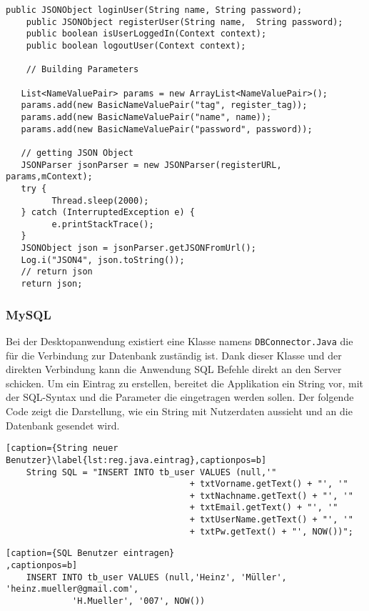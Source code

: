 \begin{lstlisting}[caption={User Functions},captionpos=b]
    public JSONObject loginUser(String name, String password);
    public JSONObject registerUser(String name,  String password);
    public boolean isUserLoggedIn(Context context);
    public boolean logoutUser(Context context);
    
    // Building Parameters

   List<NameValuePair> params = new ArrayList<NameValuePair>();
   params.add(new BasicNameValuePair("tag", register_tag));
   params.add(new BasicNameValuePair("name", name));
   params.add(new BasicNameValuePair("password", password));

   // getting JSON Object
   JSONParser jsonParser = new JSONParser(registerURL, params,mContext);
   try {
         Thread.sleep(2000);
   } catch (InterruptedException e) {
         e.printStackTrace();
   }
   JSONObject json = jsonParser.getJSONFromUrl();
   Log.i("JSON4", json.toString());
   // return json
   return json;
\end{lstlisting}


\subsubsection{MySQL}
Bei der Desktopanwendung existiert eine Klasse namens \texttt{DBConnector.Java} die für die Verbindung zur Datenbank zuständig ist. Dank dieser Klasse und der direkten Verbindung kann die Anwendung  SQL Befehle direkt an den Server schicken. Um ein Eintrag zu erstellen, bereitet die Applikation ein String vor, mit der SQL-Syntax und die Parameter die eingetragen werden sollen. Der folgende Code zeigt die Darstellung, wie ein String mit Nutzerdaten aussieht und an die Datenbank gesendet wird.


\begin{lstlisting}[caption={String neuer Benutzer}\label{lst:reg.java.eintrag},captionpos=b]
	String SQL = "INSERT INTO tb_user VALUES (null,'"
									+ txtVorname.getText() + "', '"
									+ txtNachname.getText() + "', '"
									+ txtEmail.getText() + "', '"
									+ txtUserName.getText() + "', '"
									+ txtPw.getText() + "', NOW())";
\end{lstlisting}

\begin{lstlisting}[caption={SQL Benutzer eintragen}
,captionpos=b]
	INSERT INTO tb_user VALUES (null,'Heinz', 'Müller', 'heinz.mueller@gmail.com',
			 'H.Mueller', '007', NOW())
\end{lstlisting}

